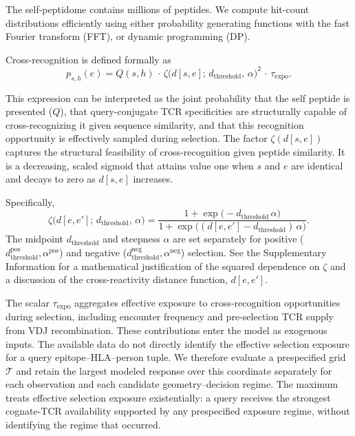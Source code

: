 \documentclass[11pt]{article}
\begin{document}
The self-peptidome contains millions of peptides. We compute hit-count distributions efficiently using either probability generating functions with the fast Fourier transform (FFT), or dynamic programming (DP).

Cross-recognition is defined formally as
\begin{equation}
p_{s,h}(e) = Q(s, h)\,\cdot\,\zeta\bigl(d[s,e];\,d_{\mathrm{threshold}},\,\alpha\bigr)^{2}\,\cdot\,\tau_{\mathrm{expo}}.
\label{eq:ps}
\end{equation}

This expression can be interpreted as the joint probability that the self peptide is presented ($Q$), that query-conjugate TCR specificities are structurally capable of cross-recognizing it given sequence similarity, and that this recognition opportunity is effectively sampled during selection. The factor $\zeta(d[s,e])$ captures the structural feasibility of cross-recognition given peptide similarity. It is a decreasing, scaled sigmoid that attains value one when \(s\) and \(e\) are identical and decays to zero as \(d[s,e]\) increases.

Specifically,
\begin{equation}
\zeta\bigl(d[e,e'];\,d_{\mathrm{threshold}},\,\alpha\bigr)
=
\frac{1 + \exp\bigl(-d_{\mathrm{threshold}}\,\alpha\bigr)}
     {1 + \exp\bigl((d[e,e'] - d_{\mathrm{threshold}})\,\alpha\bigr)}.
\label{eq:zeta}
\end{equation}
The midpoint \(d_{\mathrm{threshold}}\) and steepness \(\alpha\) are set separately for positive (\(d^{\mathrm{pos}}_{\mathrm{threshold}},\alpha^{\mathrm{pos}}\)) and negative (\(d^{\mathrm{neg}}_{\mathrm{threshold}},\alpha^{\mathrm{neg}}\)) selection. See the Supplementary Information for a mathematical justification of the squared dependence on \(\zeta\) and a discussion of the cross-reactivity distance function, \(d[e,e']\).

The scalar \(\tau_{\mathrm{expo}}\) aggregates effective exposure to
cross-recognition opportunities during selection, including encounter
frequency and pre-selection TCR supply from VDJ recombination. These
contributions enter the model as exogenous inputs. The available data do not
directly identify the effective selection exposure for a query
epitope--HLA--person tuple. We therefore evaluate a prespecified grid
\(\mathcal{T}\) and retain the largest modeled response over this coordinate
separately for each observation and each candidate geometry--decision regime.
The maximum treats effective selection exposure existentially: a
query receives the strongest cognate-TCR availability supported by any
prespecified exposure regime, without identifying the regime that occurred.
\end{document}

